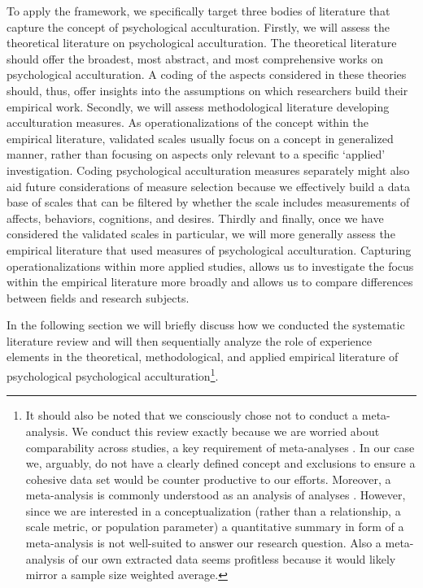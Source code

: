 \documentclass[man, 12pt, a4paper]{apa7}
\begin{document}
To apply the framework, we specifically target three bodies of literature that capture the concept of psychological acculturation. Firstly, we will assess the theoretical literature on psychological acculturation. The theoretical literature should offer the broadest, most abstract, and most comprehensive works on psychological acculturation. A coding of the aspects considered in these theories should, thus, offer insights into the assumptions on which researchers build their empirical work.
Secondly, we will assess methodological literature developing acculturation measures. As operationalizations of the concept within the empirical literature, validated scales usually focus on a concept in generalized manner, rather than focusing on aspects only relevant to a specific `applied' investigation. Coding psychological acculturation measures separately might also aid future considerations of measure selection because we effectively build a data base of scales that can be filtered by whether the scale includes measurements of affects, behaviors, cognitions, and desires. 
Thirdly and finally, once we have considered the validated scales in particular, we will more generally assess the empirical literature that used measures of psychological acculturation. Capturing operationalizations within more applied studies, allows us to investigate the focus within the empirical literature more broadly and allows us to compare differences between fields and research subjects.

In the following section we will briefly discuss how we conducted the systematic literature review and will then sequentially analyze the role of experience elements in the theoretical, methodological, and applied empirical literature of psychological psychological acculturation\footnote{It should also be noted that we consciously chose not to conduct a meta-analysis. We conduct this review exactly because we are worried about comparability across studies, a key requirement of meta-analyses \citep{Pogue1998}. In our case we, arguably, do not have a clearly defined concept and exclusions to ensure a cohesive data set would be counter productive to our efforts. Moreover, a meta-analysis is commonly understood as an analysis of analyses \citep{Glass1976}. However, since we are interested in a conceptualization (rather than a relationship, a scale metric, or population parameter) a quantitative summary in form of a meta-analysis is not well-suited to answer our research question. Also a meta-analysis of our own extracted data seems profitless because it would likely mirror a sample size weighted average.}.
\end{document}
